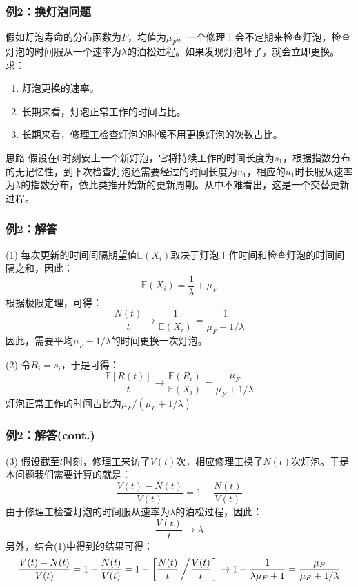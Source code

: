 \documentclass[t]{beamer}
\newcommand{\E}{\mathbb{E}}
\begin{document}
\begin{frame}
  \frametitle{例2：换灯泡问题}
  假如灯泡寿命的分布函数为$F$，均值为$\mu_F$。一个修理工会不定期来检查灯泡，检查灯泡的时间服从一个速率为$\lambda$的泊松过程。如果发现灯泡坏了，就会立即更换。求：
  \begin{enumerate}
  \item 灯泡更换的速率。
  \item 长期来看，灯泡正常工作的时间占比。
  \item 长期来看，修理工检查灯泡的时候不用更换灯泡的次数占比。
  \end{enumerate}
  
\begin{block}{思路}
  假设在0时刻安上一个新灯泡，它将持续工作的时间长度为$s_1$，根据指数分布的无记忆性，到下次检查灯泡还需要经过的时间长度为$u_1$，相应的$u_1$时长服从速率为$\lambda$的指数分布，依此类推开始新的更新周期。从中不难看出，这是一个交替更新过程。  
\end{block}
\end{frame}


\begin{frame}
  \frametitle{例2：解答}
  (1) 每次更新的时间间隔期望值$\E(X_i)$取决于灯泡工作时间和检查灯泡的时间间隔之和，因此：
  \[\E(X_i)=\frac{1}{\lambda}+\mu_F\]
  根据极限定理，可得：
  \[\frac{N(t)}{t}\to \frac{1}{\E(X_i)}=\frac{1}{\mu_F+1/\lambda}\]
  因此，需要平均$\mu_F+1/\lambda$的时间更换一次灯泡。
  
  (2) 令$R_i=s_i$，于是可得：
  \[\frac{\E[R(t)]}{t}\to \frac{\E(R_i)}{\E(X_i)}=\frac{\mu_F}{\mu_F+1/\lambda}\]
  灯泡正常工作的时间占比为$\mu_F/(\mu_F+1/\lambda)$
  

\end{frame}


\begin{frame}
  \frametitle{例2：解答(cont.)}
  (3) 假设截至$t$时刻，修理工来访了$V(t)$次，相应修理工换了$N(t)$次灯泡。于是本问题我们需要计算的就是：
  \[\frac{V(t)-N(t)}{V(t)}=1-\frac{N(t)}{V(t)}\]
  由于修理工检查灯泡的时间服从速率为$\lambda$的泊松过程，因此：
  \[\frac{V(t)}{t}\to \lambda\]
  另外，结合(1)中得到的结果可得：
  \[\frac{V(t)-N(t)}{V(t)}=1-\frac{N(t)}{V(t)}=1-\left[\frac{N(t)}{t}\left/\frac{V(t)}{t}\right. \right]\to 1-\frac{1}{\lambda \mu_F+1}=\frac{\mu_F}{\mu_F+1/\lambda}\]
  

\end{frame}
\end{document}
